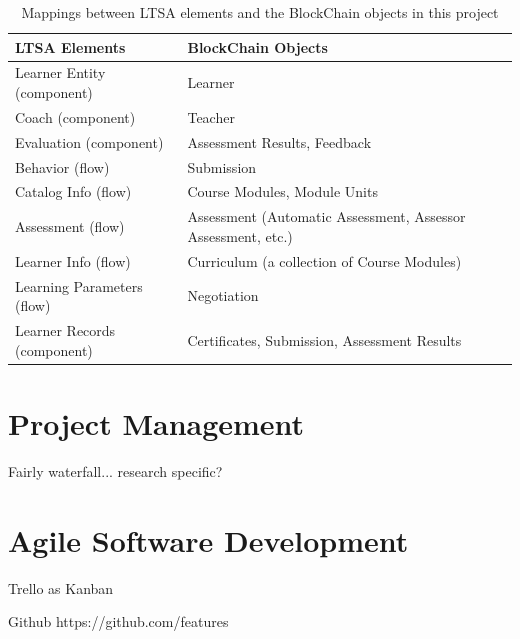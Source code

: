 \begin{table}[!h] 
    \caption{Mappings between LTSA elements and the BlockChain objects in this project}
    \centering
    \label{table:ltsa-bcu}
    \begin{tabularx}{\textwidth}{l|X}
        \textbf{LTSA Elements} & \textbf{BlockChain Objects}
        \\\toprule
        Learner Entity (component) & Learner
        \\\midrule
        Coach (component) & Teacher
        \\\midrule
        Evaluation (component) & Assessment Results, Feedback
        \\\midrule
        Behavior (flow) & Submission
        \\\midrule
        Catalog Info (flow) & Course Modules, Module Units
        \\\midrule
        Assessment (flow) & Assessment (Automatic Assessment, Assessor Assessment, etc.)
        \\\midrule
        Learner Info (flow) & Curriculum (a collection of Course Modules)
        \\\midrule
        Learning Parameters (flow) & Negotiation
        \\\midrule
        Learner Records (component) & Certificates, Submission, Assessment Results
        \\\bottomrule
    \end{tabularx}
\end{table}

\section{Project Management}

Fairly waterfall... research specific?

\section{Agile Software Development}

Trello as Kanban

Github
https://github.com/features


